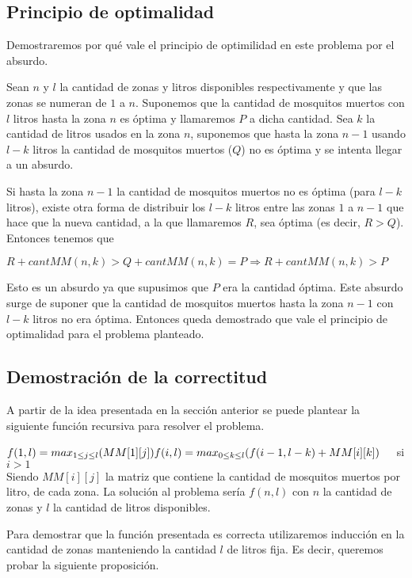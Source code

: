 \documentclass[a4paper,10pt] {article}
\begin{document}
\subsection*{Principio de optimalidad}

Demostraremos por qu\'e vale el principio de optimilidad en este problema por el absurdo.

Sean $n$ y $l$ la cantidad de zonas y litros disponibles respectivamente y que las zonas se numeran de $1$ a $n$. Suponemos que la cantidad de mosquitos muertos con $l$ litros hasta la zona $n$ es \'optima y llamaremos $P$ a dicha cantidad. Sea $k$ la cantidad de litros usados en la zona $n$, suponemos que hasta la zona $n-1$ usando $l-k$ litros la cantidad de mosquitos muertos ($Q$) no es \'optima y se intenta llegar a un absurdo.

Si hasta la zona $n-1$ la cantidad de mosquitos muertos no es \'optima (para $l-k$ litros), existe otra forma de distribuir los $l-k$ litros entre las zonas $1$ a $n-1$ que hace que la nueva cantidad, a la que llamaremos $R$, sea \'optima (es decir, $R > Q$). Entonces tenemos que

$R + cantMM(n,k) > Q + cantMM(n,k) = P \Rightarrow R + cantMM(n,k) > P$

Esto es un absurdo ya que supusimos que $P$ era la cantidad \'optima. Este absurdo surge de suponer que la cantidad de mosquitos muertos hasta la zona $n-1$ con $l-k$ litros no era \'optima. Entonces queda demostrado que vale el principio de optimalidad para el problema planteado.

\subsection*{Demostraci\'on de la correctitud}

A partir de la idea presentada en la secci\'on anterior se puede plantear la siguiente funci\'on recursiva para resolver el problema.

$\\ f(1,l) = max_{1 \leq j \leq l} (MM[1][j]) \\
 f(i,l) = max_{0 \leq k \leq l} (f(i-1, l-k) + MM[i][k]) \;\;\;\; $ si $i > 1
$ \\

Siendo $MM[i][j]$ la matriz que contiene la cantidad de mosquitos muertos por litro, de cada zona. La soluci\'on al problema ser\'ia $f(n,l)$ con $n$ la cantidad de zonas y $l$ la cantidad de litros disponibles.

Para demostrar que la funci\'on presentada es correcta utilizaremos inducci\'on en la cantidad de zonas manteniendo la cantidad $l$ de litros fija. Es decir, queremos probar la siguiente proposición. \\
\end{document}

